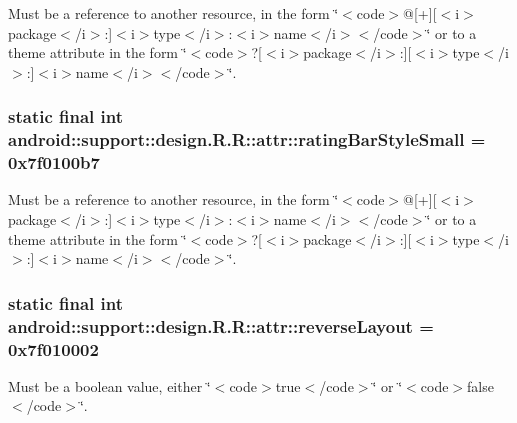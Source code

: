 Must be a reference to another resource, in the form \char`\"{}$<$code$>$@\mbox{[}+\mbox{]}\mbox{[}$<$i$>$package$<$/i$>$:\mbox{]}$<$i$>$type$<$/i$>$:$<$i$>$name$<$/i$>$$<$/code$>$\char`\"{} or to a theme attribute in the form \char`\"{}$<$code$>$?\mbox{[}$<$i$>$package$<$/i$>$:\mbox{]}\mbox{[}$<$i$>$type$<$/i$>$:\mbox{]}$<$i$>$name$<$/i$>$$<$/code$>$\char`\"{}. \hypertarget{classandroid_1_1support_1_1design_1_1_r_1_1attr_57c3319d167682a024228cd1f652f41b}{
\subsubsection[{ratingBarStyleSmall}]{\setlength{\rightskip}{0pt plus 5cm}static final int android::support::design.R.R::attr::ratingBarStyleSmall = 0x7f0100b7}}
\label{classandroid_1_1support_1_1design_1_1_r_1_1attr_57c3319d167682a024228cd1f652f41b}


Must be a reference to another resource, in the form \char`\"{}$<$code$>$@\mbox{[}+\mbox{]}\mbox{[}$<$i$>$package$<$/i$>$:\mbox{]}$<$i$>$type$<$/i$>$:$<$i$>$name$<$/i$>$$<$/code$>$\char`\"{} or to a theme attribute in the form \char`\"{}$<$code$>$?\mbox{[}$<$i$>$package$<$/i$>$:\mbox{]}\mbox{[}$<$i$>$type$<$/i$>$:\mbox{]}$<$i$>$name$<$/i$>$$<$/code$>$\char`\"{}. \hypertarget{classandroid_1_1support_1_1design_1_1_r_1_1attr_1509d1de2760a7d706105c7289d6ff7f}{
\subsubsection[{reverseLayout}]{\setlength{\rightskip}{0pt plus 5cm}static final int android::support::design.R.R::attr::reverseLayout = 0x7f010002}}
\label{classandroid_1_1support_1_1design_1_1_r_1_1attr_1509d1de2760a7d706105c7289d6ff7f}


Must be a boolean value, either \char`\"{}$<$code$>$true$<$/code$>$\char`\"{} or \char`\"{}$<$code$>$false$<$/code$>$\char`\"{}. 


